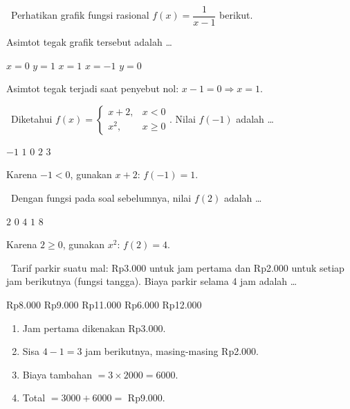 \documentclass[11pt,a4paper]{exam}
\newenvironment{langkah}{%
  \begin{enumerate}[label=\textbf{Langkah \arabic*:},leftmargin=2.6em,
    itemsep=2pt,topsep=2pt]}{\end{enumerate}}
\newcommand{\Inter}{{\footnotesize\textsf{\textcolor{biru}{[Intermediate]}}}\ }
\newcommand{\Adv}{{\footnotesize\textsf{\textcolor{oranye}{[Advanced]}}}\ }
\begin{document}
\begin{questions}
\question \Inter Perhatikan grafik fungsi rasional $f(x) = \dfrac{1}{x-1}$ berikut.

\begin{center}
\end{center}

Asimtot tegak grafik tersebut adalah \dots
\begin{choices}
\choice $x = 0$ \choice $y = 1$ \CorrectChoice $x = 1$ \choice $x = -1$ \choice $y = 0$
\end{choices}
\begin{solution}Asimtot tegak terjadi saat penyebut nol: $x-1=0 \Rightarrow x=1.$\end{solution}

\question \Inter Diketahui $f(x) = \begin{cases} x+2, & x<0\\ x^{2}, & x \ge 0 \end{cases}$.
Nilai $f(-1)$ adalah \dots
\begin{choices}
\choice $-1$ \CorrectChoice $1$ \choice $0$ \choice $2$ \choice $3$
\end{choices}
\begin{solution}Karena $-1<0$, gunakan $x+2$: $f(-1) = 1.$\end{solution}

\question \Inter Dengan fungsi pada soal sebelumnya, nilai $f(2)$ adalah \dots
\begin{choices}
\choice $2$ \choice $0$ \CorrectChoice $4$ \choice $1$ \choice $8$
\end{choices}
\begin{solution}Karena $2 \ge 0$, gunakan $x^{2}$: $f(2) = 4.$\end{solution}

\question \Adv Tarif parkir suatu mal: Rp3.000 untuk jam pertama dan Rp2.000 untuk
setiap jam berikutnya (fungsi tangga). Biaya parkir selama 4 jam adalah \dots
\begin{choices}
\choice Rp8.000 \CorrectChoice Rp9.000 \choice Rp11.000 \choice Rp6.000 \choice Rp12.000
\end{choices}
\begin{solution}
\begin{langkah}
\item Jam pertama dikenakan Rp3.000.
\item Sisa $4-1 = 3$ jam berikutnya, masing-masing Rp2.000.
\item Biaya tambahan $= 3 \times 2000 = 6000$.
\item Total $= 3000 + 6000 = $ Rp9.000.
\end{langkah}
\end{solution}


\end{questions}
\end{document}
